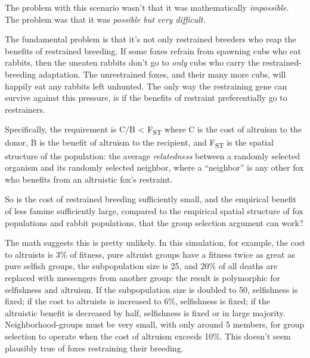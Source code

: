 {
 The problem with this scenario wasn't that it was
mathematically \textit{impossible.} The problem was that it was
\textit{possible but very difficult.}}

{
 The fundamental problem is that it's not only
restrained breeders who reap the benefits of restrained breeding. If
some foxes refrain from spawning cubs who eat rabbits, then the uneaten
rabbits don't go to \textit{only} cubs who carry the
restrained-breeding adaptation. The unrestrained foxes, and their many
more cubs, will happily eat any rabbits left unhunted. The only way the
restraining gene can survive against this pressure, is if the benefits
of restraint preferentially go to restrainers.}

{
 Specifically, the requirement is C$/$B {\textless}
F\textsubscript{ST} where C is the cost of altruism to the donor, B is
the benefit of altruism to the recipient, and F\textsubscript{ST} is
the spatial structure of the population: the average
\textit{relatedness} between a randomly selected organism and its
randomly selected neighbor, where a
``neighbor'' is any other fox who
benefits from an altruistic fox's
restraint.}

{
 So is the cost of restrained breeding sufficiently small, and the
empirical benefit of less famine sufficiently large, compared to the
empirical spatial structure of fox populations and rabbit populations,
that the group selection argument can work?}

{
 The math suggests this is pretty unlikely. In this simulation, for
example, the cost to altruists is 3\% of fitness, pure altruist groups
have a fitness twice as great as pure selfish groups, the subpopulation
size is 25, and 20\% of all deaths are replaced with messengers from
another group: the result is polymorphic for selfishness and altruism.
If the subpopulation size is doubled to 50, selfishness is fixed; if
the cost to altruists is increased to 6\%, selfishness is fixed; if the
altruistic benefit is decreased by half, selfishness is fixed or in
large majority. Neighborhood-groups must be very small, with only
around 5 members, for group selection to operate when the cost of
altruism exceeds 10\%. This doesn't seem plausibly true
of foxes restraining their breeding.}

